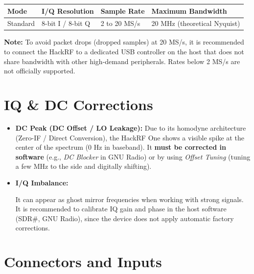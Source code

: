 \documentclass[11pt]{article}
\begin{document}
\begin{table}[h]
    \centering
    \begin{tabular}{llll}
        \toprule
        \textbf{Mode} & \textbf{I/Q Resolution} & \textbf{Sample Rate} & \textbf{Maximum Bandwidth} \\
        \midrule
        Standard & 8-bit I / 8-bit Q & 2 to 20 MS/s & 20 MHz (theoretical Nyquist) \\
        \bottomrule
    \end{tabular}
\end{table}

\textbf{Note:} To avoid packet drops (dropped samples) at 20 MS/s, it is recommended to connect the HackRF to a dedicated USB controller on the host that does not share bandwidth with other high-demand peripherals. Rates below 2 MS/s are not officially supported.

\section{IQ \& DC Corrections}

\begin{itemize}
    \item \textbf{DC Peak (DC Offset / LO Leakage):} Due to its homodyne architecture (Zero-IF / Direct Conversion), the HackRF One shows a visible spike at the center of the spectrum (0 Hz in baseband). It \textbf{must be corrected in software} (e.g., \textit{DC Blocker} in GNU Radio) or by using \textit{Offset Tuning} (tuning a few MHz to the side and digitally shifting).
    \item \textbf{I/Q Imbalance:}
    \begin{pendingbox}
    It can appear as ghost mirror frequencies when working with strong signals. It is recommended to calibrate IQ gain and phase in the host software (SDR\#, GNU Radio), since the device does not apply automatic factory corrections.
    \end{pendingbox}
\end{itemize}

\section{Connectors and Inputs}
\end{document}
